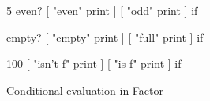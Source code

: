 \centering

\begin{minipage}{0.65\linewidth}
  \begin{factorcode}
    5 even? [ "even" print ] [ "odd" print ] if

    { } empty? [ "empty" print ] [ "full" print ] if

    100 [ "isn't f" print ] [ "is f" print ] if
  \end{factorcode}
\end{minipage}

\caption{Conditional evaluation in Factor}
